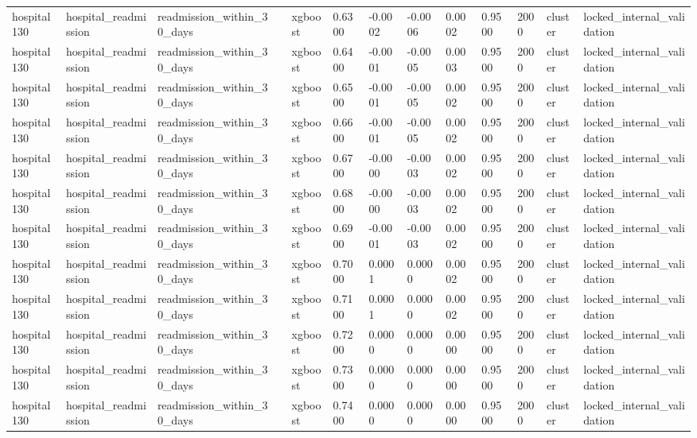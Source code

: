 \begin{tabular}{lllllllllllll}
hospital130 & hospital\_readmission & readmission\_within\_30\_days &  & xgboost & 0.6300 & -0.0002 & -0.0006 & 0.0002 & 0.9500 & 2000 & cluster & locked\_internal\_validation \\
hospital130 & hospital\_readmission & readmission\_within\_30\_days &  & xgboost & 0.6400 & -0.0001 & -0.0005 & 0.0003 & 0.9500 & 2000 & cluster & locked\_internal\_validation \\
hospital130 & hospital\_readmission & readmission\_within\_30\_days &  & xgboost & 0.6500 & -0.0001 & -0.0005 & 0.0002 & 0.9500 & 2000 & cluster & locked\_internal\_validation \\
hospital130 & hospital\_readmission & readmission\_within\_30\_days &  & xgboost & 0.6600 & -0.0001 & -0.0005 & 0.0002 & 0.9500 & 2000 & cluster & locked\_internal\_validation \\
hospital130 & hospital\_readmission & readmission\_within\_30\_days &  & xgboost & 0.6700 & -0.0000 & -0.0003 & 0.0002 & 0.9500 & 2000 & cluster & locked\_internal\_validation \\
hospital130 & hospital\_readmission & readmission\_within\_30\_days &  & xgboost & 0.6800 & -0.0000 & -0.0003 & 0.0002 & 0.9500 & 2000 & cluster & locked\_internal\_validation \\
hospital130 & hospital\_readmission & readmission\_within\_30\_days &  & xgboost & 0.6900 & -0.0001 & -0.0003 & 0.0002 & 0.9500 & 2000 & cluster & locked\_internal\_validation \\
hospital130 & hospital\_readmission & readmission\_within\_30\_days &  & xgboost & 0.7000 & 0.0001 & 0.0000 & 0.0002 & 0.9500 & 2000 & cluster & locked\_internal\_validation \\
hospital130 & hospital\_readmission & readmission\_within\_30\_days &  & xgboost & 0.7100 & 0.0001 & 0.0000 & 0.0002 & 0.9500 & 2000 & cluster & locked\_internal\_validation \\
hospital130 & hospital\_readmission & readmission\_within\_30\_days &  & xgboost & 0.7200 & 0.0000 & 0.0000 & 0.0000 & 0.9500 & 2000 & cluster & locked\_internal\_validation \\
hospital130 & hospital\_readmission & readmission\_within\_30\_days &  & xgboost & 0.7300 & 0.0000 & 0.0000 & 0.0000 & 0.9500 & 2000 & cluster & locked\_internal\_validation \\
hospital130 & hospital\_readmission & readmission\_within\_30\_days &  & xgboost & 0.7400 & 0.0000 & 0.0000 & 0.0000 & 0.9500 & 2000 & cluster & locked\_internal\_validation \\

\end{tabular}

